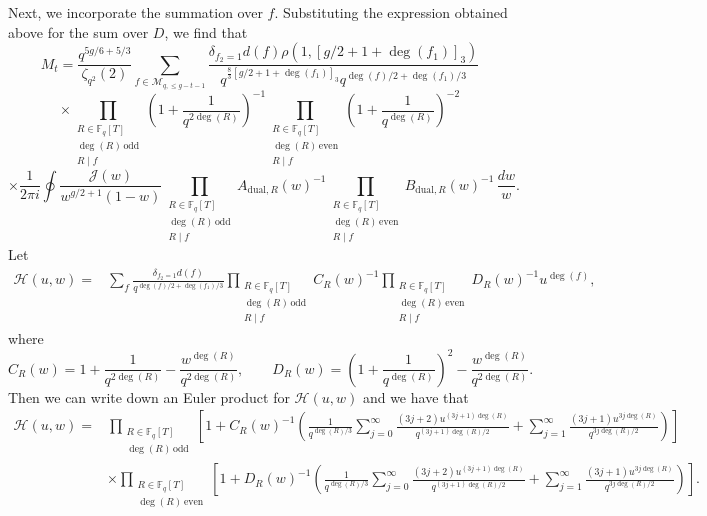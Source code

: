 \documentclass[table]{amsart}
\numberwithin{equation}{section}
\begin{document}
Next, we incorporate the summation over \( f \). Substituting the expression obtained above for the sum over \( D \), we find that  
\[
M_t= \frac{q^{5g/6+5/3}}{\zeta_{q^2}(2)} \sum_{f \in \mathcal{M}_{q,\leq g-t-1}} \frac{\delta_{f_2=1}d(f)\rho(1, [g/2+1+ \deg(f_1)]_3)}{q^{\frac{8}{3} [g/2+1+\deg(f_1)]_3}q^{\deg(f)/2+\deg(f_1)/3}} 
\]
\[
\times \prod_{\substack{R \in \mathbb{F}_q[T] \\ \deg(R)  \,\mathrm{ odd} \\ R \mid f}} \left(1+\frac{1}{q^{2\deg(R)}}\right)^{-1}
\prod_{\substack{R \in \mathbb{F}_q[T] \\ \deg(R)  \,\mathrm{ even} \\ R \mid f}} \left(1+\frac{1}{q^{\deg(R)}}\right)^{-2} 
\]
\[
\times \frac{1}{2 \pi i} \oint \frac{\mathcal{J}(w)}{w^{g/2+1}(1-w)}\prod_{\substack{R \in \mathbb{F}_q[T] \\ \deg(R)  \,\mathrm{ odd} \\ R \mid f}} A_{\mathrm{dual},R}(w)^{-1} \prod_{\substack{R \in \mathbb{F}_q[T] \\ \deg(R)  \,\mathrm{ even} \\ R\mid f}} B_{\mathrm{dual},R}(w)^{-1} \, \frac{dw}{w}.
\]
\noindent Let
\begin{align*}
\mathcal{H}(u,w)= &\sum_{f}
\frac{\delta_{f_2=1} d(f)}{q^{\deg(f)/2+\deg(f_1)/3}} 
\prod_{\substack{R \in \mathbb{F}_q[T] \\ \deg(R)  \,\mathrm{ odd} \\ R \mid f}} C_R(w)^{-1} \prod_{\substack{R \in \mathbb{F}_q[T] \\ \deg(R)  \,\mathrm{ even} \\ R\mid f}} D_R(w)^{-1} u^{\deg(f)},
\end{align*}
where 
\[C_R(w)=1+\frac{1}{q^{2\deg(R)}}-\frac{w^{\deg(R)}}{q^{2\deg(R)}}, \qquad D_R(w)=\left(1+\frac{1}{q^{\deg(R)}}\right)^2-\frac{w^{\deg(R)}}{q^{2\deg(R)}}.\]
\noindent Then we can write down an Euler product for $\mathcal{H}(u,w)$ and we have that
{\small \begin{align*}
 \mathcal{H}(u,w)= & \prod_{\substack{R \in \mathbb{F}_q[T] \\ \deg(R)  \,\mathrm{ odd}}} \left[1+C_R(w)^{-1} \left ( \frac{1}{q^{\deg(R)/3}} \sum_{j=0}^{\infty} \frac{ (3j+2)u^{(3j+1) \deg(R)}}{q^{(3j+1) \deg(R)/2}} + \sum_{j=1}^{\infty} \frac{(3j+1) u^{3j \deg(R)}}{q^{3j\deg(R)/2}}\right ) \right] \\
 & \times  \prod_{\substack{R \in \mathbb{F}_q[T] \\ \deg(R)  \,\mathrm{ even}}} \left[1+D_R(w)^{-1} \left ( \frac{1}{q^{\deg(R)/3}} \sum_{j=0}^{\infty} \frac{ (3j+2)u^{(3j+1) \deg(R)}}{q^{(3j+1) \deg(R)/2}} + \sum_{j=1}^{\infty} \frac{ (3j+1)u^{3j \deg(R)}}{q^{3j\deg(R)/2}}\right ) \right].
\end{align*}}
\end{document}
